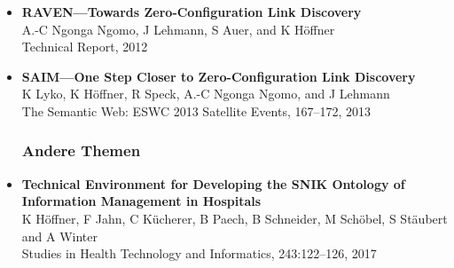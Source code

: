\documentclass{article}
\begin{document}
\begin{itemize}
\item \textbf{RAVEN---Towards Zero-Configuration Link Discovery}~\\
A.-C Ngonga Ngomo, J Lehmann, S Auer, and K Höffner\\
Technical Report, 2012

\item \textbf{SAIM---One Step Closer to Zero-Configuration Link Discovery}~\\
K Lyko, K Höffner, R Speck, A.-C Ngonga Ngomo, and J Lehmann\\
The Semantic Web: ESWC 2013 Satellite Events, 167--172, 2013

\subsubsection*{Andere Themen}

\item \textbf{Technical Environment for Developing the {SNIK} Ontology of Information Management in Hospitals}~\\
K Höffner, F Jahn, C Kücherer, B Paech, B Schneider, M Schöbel, S Stäubert and A Winter\\
Studies in Health Technology and Informatics, 243:122--126, 2017

\end{itemize}
\end{document}
